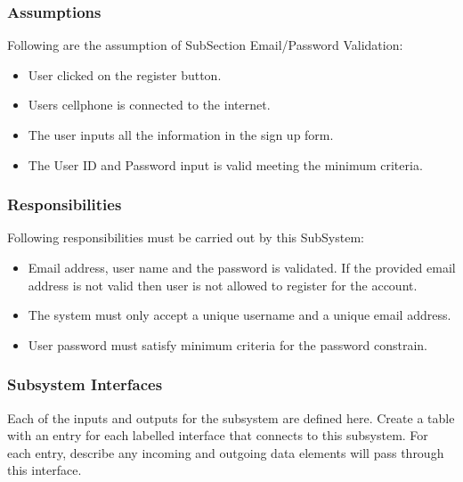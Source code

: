\subsubsection{Assumptions}
Following are the assumption of SubSection Email/Password Validation:
\begin{itemize}
    \item User clicked on the register button.
    \item Users cellphone is connected to the internet.
    \item The user inputs all the information in the sign up form.
    \item The User ID and Password input is valid meeting the minimum criteria.
\end{itemize}
\subsubsection{Responsibilities}
Following responsibilities must be carried out by this SubSystem:
\begin{itemize}
    \item Email address, user name and the password is validated. If the provided email address is not valid then user is not allowed to register for the account.
    \item The system must only accept a unique username and a unique email address.
    \item User password must satisfy minimum criteria for the password constrain.
\end{itemize}

\subsubsection{Subsystem Interfaces}
Each of the inputs and outputs for the subsystem are defined here. Create a table with an entry for each labelled interface that connects to this subsystem. For each entry, describe any incoming and outgoing data elements will pass through this interface.

